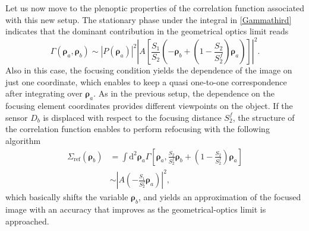\documentclass[aps,pra,amssymb,twocolumn,amsmath,superscriptaddress,showpacs,10pt]{revtex4-1}
\def\d{\mathrm{d}}
\begin{document}
Let us now move to the plenoptic properties of the correlation function associated with this new setup. The stationary phase under the integral in \eqref{Gammathird} indicates that the dominant contribution in the geometrical optics limit reads
\begin{equation}
\Gamma(\bm{\rho}_a,\bm{\rho}_b) \sim |P(\bm{\rho}_a)|^2 \left| A \left[ \frac{S_1}{S_2} \!\left( -\bm{\rho}_b + \!\left( 1- \frac{S_2}{S_2^f} \right)\!\bm{\rho}_a \right)\! \right] \right|^2.
\end{equation}
Also in this case, the focusing condition yields the dependence of the image on just one coordinate, which enables to keep a quasi one-to-one correspondence after integrating over $\bm{\rho}_a$. As in the previous setup, the dependence on the focusing element coordinates provides different viewpoints on the object. If the sensor $D_b$ is displaced with respect to the focusing distance $S_2^f$, the structure of the correlation function enables to perform refocusing with the following algorithm
\begin{align}
\Sigma_{\mathrm{ref}}(\bm{\rho}_b)\! & = \!\int\d^2\!\bm{\rho}_a \Gamma\!\left[ \bm{\rho}_a, \frac{S_2}{S_2^f}\bm{\rho}_b + \!\left(1-\frac{S_2}{S_2^f}\right) \bm{\rho}_a \right] \nonumber \\ & \sim \left| A \left(-\frac{S_1}{S_2^f}\bm{\rho}_a \right) \right|^2 ,
\end{align} 
which basically shifts the variable $\bm{\rho}_b$, and yields an approximation of the focused image with an accuracy that improves as the geometrical-optics limit is approached.
\end{document}
